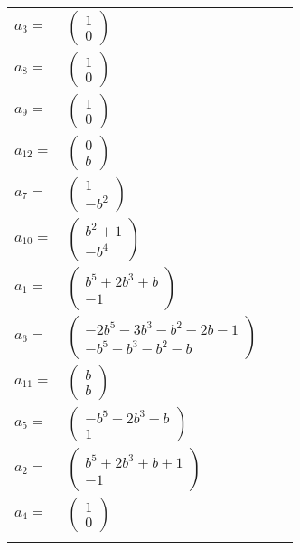 \documentclass[1p]{elsarticle_modified}
\theoremstyle{definition}
\begin{document}
\begin{tabular}{m{7pt} m{180pt} m{7pt} m{180pt} }
\flushright $a_{3}=$&$\begin{pmatrix}1\\0\end{pmatrix}$ \\
\flushright $a_{8}=$&$\begin{pmatrix}1\\0\end{pmatrix}$ \\
\flushright $a_{9}=$&$\begin{pmatrix}1\\0\end{pmatrix}$ \\
\flushright $a_{12}=$&$\begin{pmatrix}0\\b\end{pmatrix}$ \\
\flushright $a_{7}=$&$\begin{pmatrix}1\\- b^2\end{pmatrix}$ \\
\flushright $a_{10}=$&$\begin{pmatrix}b^2+1\\- b^4\end{pmatrix}$ \\
\flushright $a_{1}=$&$\begin{pmatrix}b^5+2 b^3+b\\-1\end{pmatrix}$ \\
\flushright $a_{6}=$&$\begin{pmatrix}-2 b^5-3 b^3- b^2-2 b-1\\- b^5- b^3- b^2- b\end{pmatrix}$ \\
\flushright $a_{11}=$&$\begin{pmatrix}b\\b\end{pmatrix}$ \\
\flushright $a_{5}=$&$\begin{pmatrix}- b^5-2 b^3- b\\1\end{pmatrix}$ \\
\flushright $a_{2}=$&$\begin{pmatrix}b^5+2 b^3+b+1\\-1\end{pmatrix}$ \\
\flushright $a_{4}=$&$\begin{pmatrix}1\\0\end{pmatrix}$\\&\end{tabular}
\end{document}
